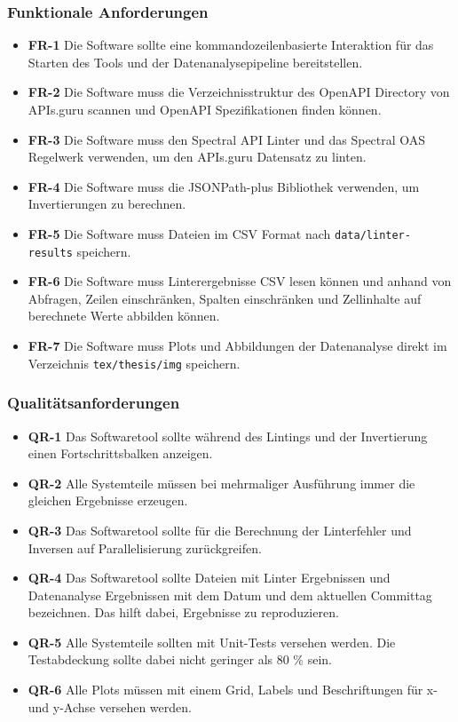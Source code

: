 \subsubsection{Funktionale Anforderungen} \label{sec:funktionaleanforderungen}
\begin{itemize}
  \item \textbf{FR-1} Die Software sollte eine kommandozeilenbasierte Interaktion für das Starten des Tools und der Datenanalysepipeline bereitstellen.
  \item \textbf{FR-2} Die Software muss die Verzeichnisstruktur des OpenAPI Directory von APIs.guru scannen und OpenAPI Spezifikationen finden können.
  \item \textbf{FR-3} Die Software muss den Spectral \acs{API} Linter und das Spectral \acs{OAS} Regelwerk verwenden, um den APIs.guru Datensatz zu linten.
  \item \textbf{FR-4} Die Software muss die JSONPath-plus Bibliothek verwenden, um Invertierungen zu berechnen.
  \item \textbf{FR-5} Die Software muss Dateien im \acs{CSV} Format nach \texttt{data/linter-results} speichern.
  \item \textbf{FR-6} Die Software muss Linterergebnisse \acs{CSV} lesen können und anhand von Abfragen, Zeilen einschränken, Spalten einschränken und Zellinhalte auf berechnete Werte abbilden können.
  \item \textbf{FR-7} Die Software muss Plots und Abbildungen der Datenanalyse direkt im Verzeichnis \texttt{tex/thesis/img} speichern.
\end{itemize}


\subsubsection{Qualitätsanforderungen} \label{sec:qualitätsanforderungen}
\begin{itemize}
  \item \textbf{QR-1} Das Softwaretool sollte während des Lintings und der Invertierung einen Fortschrittsbalken anzeigen.
  \item \textbf{QR-2} Alle Systemteile müssen bei mehrmaliger Ausführung immer die gleichen Ergebnisse erzeugen.
  \item \textbf{QR-3} Das Softwaretool sollte für die Berechnung der Linterfehler und Inversen auf Parallelisierung zurückgreifen.
  \item \textbf{QR-4} Das Softwaretool sollte Dateien mit Linter Ergebnissen und Datenanalyse Ergebnissen mit dem Datum und dem aktuellen Committag bezeichnen. Das hilft dabei, Ergebnisse zu reproduzieren.
  \item \textbf{QR-5} Alle Systemteile sollten mit Unit-Tests versehen werden. Die Testabdeckung sollte dabei nicht geringer als 80 \% sein.
  \item \textbf{QR-6} Alle Plots müssen mit einem Grid, Labels und Beschriftungen für x- und y-Achse versehen werden. 
\end{itemize}


